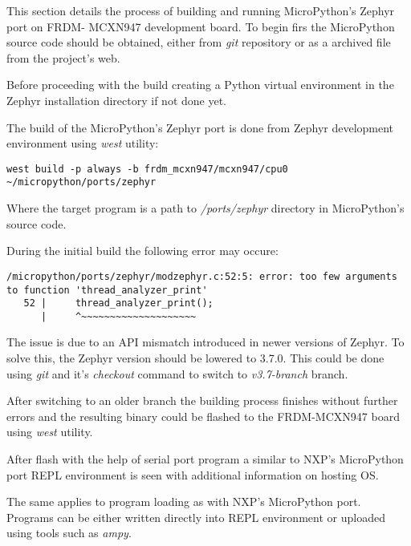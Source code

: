 \documentclass[twoside, 12pt]{article}
\begin{document}
This section details the process of building and running MicroPython's Zephyr port on FRDM-
MCXN947 development board. To begin firs the MicroPython source code should be obtained, 
either from \textit{git} repository or as a archived file from the project's web.

Before proceeding with the build creating a Python virtual environment in the Zephyr 
installation directory if not done yet.

The build of the MicroPython's Zephyr port is done from Zephyr development environment using \textit{west} utility:
\begin{lstlisting}[caption=Building MicroPython's Zephyr port, breaklines=true]
west build -p always -b frdm_mcxn947/mcxn947/cpu0 ~/micropython/ports/zephyr
\end{lstlisting}
Where the target program is a path to \textit{/ports/zephyr} directory in MicroPython's source
code.

During the initial build the following error may occure:
\begin{lstlisting}[caption=Error building MicroPython's Zephyr port,breaklines=true]
/micropython/ports/zephyr/modzephyr.c:52:5: error: too few arguments to function 'thread_analyzer_print'
   52 |     thread_analyzer_print();
      |     ^~~~~~~~~~~~~~~~~~~~~
\end{lstlisting}

The issue is due to an API mismatch introduced in newer versions of Zephyr. To solve this, the
Zephyr version should be lowered to 3.7.0. This could be done using \textit{git} and it's \textit{checkout} command to switch to \textit{v3.7-branch} branch.

After switching to an older branch the building process finishes without further errors and 
the resulting binary could be flashed to the FRDM-MCXN947 board using \textit{west} utility.

After flash with the help of serial port program a similar to NXP's MicroPython port REPL environment is seen with additional information on hosting OS.

\obrazek
{}

The same applies to program loading as with NXP's MicroPython port. Programs can be either 
written directly into REPL environment or uploaded using tools such as \textit{ampy}.
\end{document}
